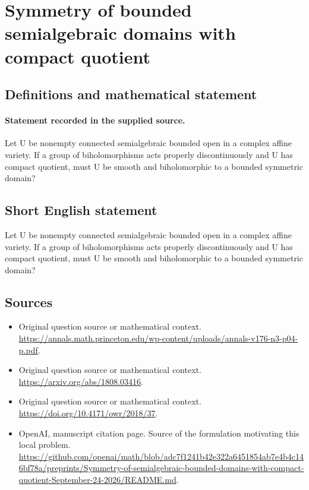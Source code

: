 \documentclass[11pt]{article}
\begin{document}
\section*{Symmetry of bounded semialgebraic domains with compact quotient}\label{statement}
\subsection{Definitions and mathematical statement}
\paragraph{Statement recorded in the supplied source.}
Let U be nonempty connected semialgebraic bounded open in a complex affine variety. If a group of biholomorphisms acts properly discontinuously and U has compact quotient, must U be smooth and biholomorphic to a bounded symmetric domain?
\subsection{Short English statement}
Let U be nonempty connected semialgebraic bounded open in a complex affine variety. If a group of biholomorphisms acts properly discontinuously and U has compact quotient, must U be smooth and biholomorphic to a bounded symmetric domain?
\subsection{Sources}
\begin{itemize}
\item[S1] Original question source or mathematical context.
\url{https://annals.math.princeton.edu/wp-content/uploads/annals-v176-n3-p04-p.pdf}.
\item[S2] Original question source or mathematical context.
\url{https://arxiv.org/abs/1808.03416}.
\item[S3] Original question source or mathematical context.
\url{https://doi.org/10.4171/owr/2018/37}.
\item[S4] OpenAI, manuscript citation page. Source of the formulation motivating this local problem.
\url{https://github.com/openai/math/blob/adc7f1241b42e322a6451854ab7e4b4c146bf78a/preprints/Symmetry-of-semialgebraic-bounded-domains-with-compact-quotient-September-24-2026/README.md}.
\end{itemize}
\end{document}
